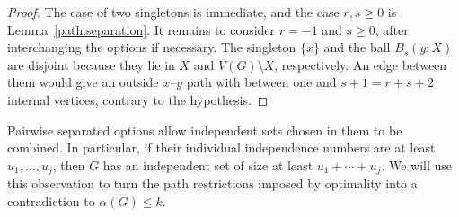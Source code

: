 \begin{proof}
The case of two singletons is immediate, and the case $r,s\geq0$ is
Lemma~\ref{path:separation}. It remains to consider $r=-1$ and $s\geq0$,
after interchanging the options if necessary. The singleton $\{x\}$
and the ball $B_s(y;X)$ are disjoint because they lie in $X$ and
$V(G)\setminus X$, respectively. An edge between them would give an
outside $x$--$y$ path with between one and $s+1=r+s+2$ internal vertices,
contrary to the hypothesis.
\end{proof}

Pairwise separated options allow independent sets chosen in them to be
combined. In particular, if their individual independence numbers are
at least $u_1,\ldots,u_j$, then $G$ has an independent set of size at
least $u_1+\cdots+u_j$. We will use this observation to turn the path
restrictions imposed by optimality into a contradiction to
$\alpha(G)\leq k$.
